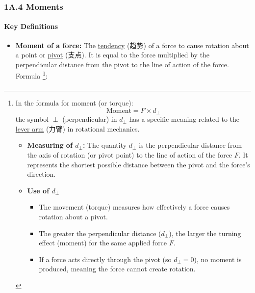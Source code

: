 
\subsubsection{1A.4 Moments}
\paragraph{Key Definitions}
\begin{itemize}
    \item \textbf{Moment of a force:} The \underline{tendency} (趋势) of a force to cause rotation about a point or
    \underline{pivot} (支点). It is equal to the force multiplied by the perpendicular distance from the pivot to the line of
    action of the force. Formula \footnote{In the formula for moment (or torque):
    \begin{equation*}
        \text{Moment} = F \times d_{\perp}
    \end{equation*}
    the symbol $\perp$ (perpendicular) in $d_{\perp}$ has a specific meaning related to the \underline{lever arm}
    \footnotemark[4] (力臂) in rotational mechanics.
    \begin{itemize}
        \item \textbf{Measuring of $d_{\perp}$:} The quantity $d_{\perp}$ is the  perpendicular distance from the axis of
        rotation (or pivot point) to the line of action of the force $F$. It represents the shortest possible distance between
        the pivot and the force's direction.
        \item \textbf{Use of $d_{\perp}$}
        \begin{itemize}
            \item The movement (torque) measures how effectively a force causes rotation about a pivot.
            \item The greater the perpendicular distance ($d_{\perp}$), the larger the turning effect (moment) for the same
            applied force $F$.
            \item If a force acts directly through the pivot (so $d_{\perp} = 0$), no moment is produced, meaning the force cannot
            create rotation.
        \end{itemize}
    \end{itemize}}:
    \begin{equation}
        \begin{split}

\end{split}
\end{equation}
\end{itemize}
